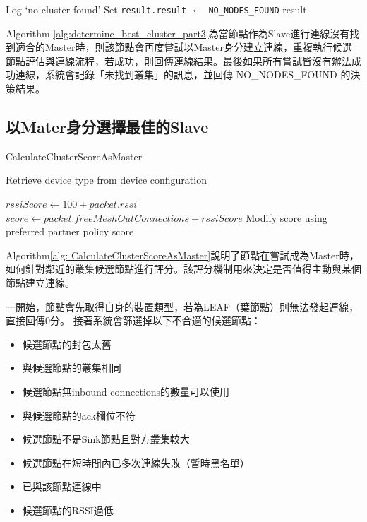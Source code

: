 \begin{ZhChapter}
\begin{algorithm}[H]
\begin{algorithmic}[1]
\State Log `no cluster found'
\State Set \texttt{result.result} $\gets$ \texttt{NO\_NODES\_FOUND}
\State \Return result
\end{algorithmic}
\end{algorithm}

Algorithm \ref{alg:determine_best_cluster_part3}為當節點作為Slave進行連線沒有找到適合的Master時，則該節點會再度嘗試以Master身分建立連線，重複執行候選節點評估與連線流程，若成功，則回傳連線結果。最後如果所有嘗試皆沒有辦法成功連線，系統會記錄「未找到叢集」的訊息，並回傳 NO\_NODES\_FOUND 的決策結果。

\subsection{以Mater身分選擇最佳的Slave}

\begin{algorithm}[H]
\caption{CalculateClusterScoreAsMaster}
\label{alg: CalculateClusterScoreAsMaster}
\begin{algorithmic}[1]
\State Retrieve device type from device configuration
  \EndIf
{}  \EndIf
{}  \EndIf
{}  \EndIf
{}  \EndIf
{}  \EndIf
{}  \EndIf
{}  \EndIf
{}  \EndIf

\State $rssiScore \gets 100 + packet.rssi$
\State $score \gets packet.freeMeshOutConnections + rssiScore$
\State Modify score using preferred partner policy
\State \Return score
\end{algorithmic}
\end{algorithm}

Algorithm\ref{alg: CalculateClusterScoreAsMaster}說明了節點在嘗試成為Master時，如何針對鄰近的叢集候選節點進行評分。該評分機制用來決定是否值得主動與某個節點建立連線。

一開始，節點會先取得自身的裝置類型，若為LEAF（葉節點）則無法發起連線，直接回傳0分。
接著系統會篩選掉以下不合適的候選節點：

\begin{itemize}
    \item 候選節點的封包太舊
    \item 與候選節點的叢集相同
    \item 候選節點無inbound connections的數量可以使用
    \item 與候選節點的ack欄位不符
    \item 候選節點不是Sink節點且對方叢集較大
    \item 候選節點在短時間內已多次連線失敗（暫時黑名單）
    \item 已與該節點連線中
    \item 候選節點的RSSI過低
\end{itemize}


\end{ZhChapter}
